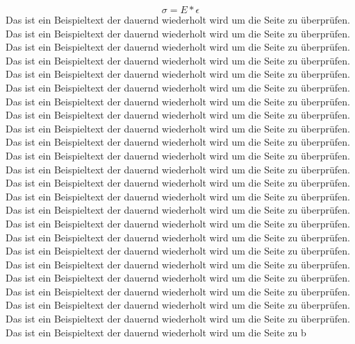 \begin{equation}
	\sigma=E*\epsilon
\end{equation}Das ist ein Beispieltext der dauernd wiederholt wird um die Seite zu überprüfen. Das ist ein Beispieltext der dauernd wiederholt wird um die Seite zu überprüfen. Das ist ein Beispieltext der dauernd wiederholt wird um die Seite zu überprüfen. Das ist ein Beispieltext der dauernd wiederholt wird um die Seite zu überprüfen. Das ist ein Beispieltext der dauernd wiederholt wird um die Seite zu überprüfen. Das ist ein Beispieltext der dauernd wiederholt wird um die Seite zu überprüfen. Das ist ein Beispieltext der dauernd wiederholt wird um die Seite zu überprüfen. Das ist ein Beispieltext der dauernd wiederholt wird um die Seite zu überprüfen. Das ist ein Beispieltext der dauernd wiederholt wird um die Seite zu überprüfen. Das ist ein Beispieltext der dauernd wiederholt wird um die Seite zu überprüfen. Das ist ein Beispieltext der dauernd wiederholt wird um die Seite zu überprüfen. Das ist ein Beispieltext der dauernd wiederholt wird um die Seite zu überprüfen. Das ist ein Beispieltext der dauernd wiederholt wird um die Seite zu überprüfen. 
Das ist ein Beispieltext der dauernd wiederholt wird um die Seite zu überprüfen. Das ist ein Beispieltext der dauernd wiederholt wird um die Seite zu überprüfen. Das ist ein Beispieltext der dauernd wiederholt wird um die Seite zu überprüfen. Das ist ein Beispieltext der dauernd wiederholt wird um die Seite zu überprüfen. Das ist ein Beispieltext der dauernd wiederholt wird um die Seite zu überprüfen. Das ist ein Beispieltext der dauernd wiederholt wird um die Seite zu überprüfen. Das ist ein Beispieltext der dauernd wiederholt wird um die Seite zu überprüfen. Das ist ein Beispieltext der dauernd wiederholt wird um die Seite zu überprüfen. Das ist ein Beispieltext der dauernd wiederholt wird um die Seite zu überprüfen. Das ist ein Beispieltext der dauernd wiederholt wird um die Seite zu überprüfen. Das ist ein Beispieltext der dauernd wiederholt wird um die Seite zu b